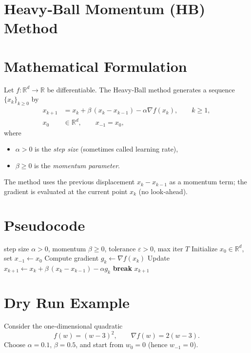\documentclass{article}
\newcommand{\R}{\mathbb{R}}
\newcommand{\norm}[1]{\left\|#1\right\|}
\begin{document}
\section*{Heavy‑Ball Momentum (HB) Method}

\section*{Mathematical Formulation}
Let $f:\R^{d}\to\R$ be differentiable.  The Heavy‑Ball method generates a sequence 
$\{x_k\}_{k\ge 0}$ by
\[
\boxed{
\begin{aligned}
x_{k+1}&=x_k+\beta\,(x_k-x_{k-1})-\alpha \nabla f(x_k),\qquad k\ge 1,\\[0.2em]
x_0&\in\R^{d},\qquad x_{-1}=x_0,
\end{aligned}}
\]
where 
\begin{itemize}
\item $\alpha>0$ is the \emph{step size} (sometimes called learning rate),
\item $\beta\ge 0$ is the \emph{momentum parameter}.
\end{itemize}
The method uses the previous displacement $x_k-x_{k-1}$ as a momentum term; the gradient is evaluated at the current point $x_k$ (no look‑ahead).

\section*{Pseudocode}
\begin{algorithm}[H]
\caption{Heavy‑Ball Momentum}
\begin{algorithmic}[1]
\REQUIRE step size $\alpha>0$, momentum $\beta\ge0$, tolerance $\varepsilon>0$, max iter $T$
\STATE Initialize $x_0\in\R^{d}$, set $x_{-1}\gets x_0$
    \STATE Compute gradient $g_k\gets\nabla f(x_k)$
    \STATE Update $x_{k+1}\gets x_k+\beta\,(x_k-x_{k-1})-\alpha g_k$
    \IF{$\norm{g_k}\le\varepsilon$}
        \STATE \textbf{break}
    \ENDIF
\ENDFOR
\RETURN $x_{k+1}$
\end{algorithmic}
\end{algorithm}

\section*{Dry Run Example}
Consider the one‑dimensional quadratic 
\[
f(w)=(w-3)^2,\qquad \nabla f(w)=2(w-3).
\]
Choose $\alpha=0.1$, $\beta=0.5$, and start from $w_0=0$ (hence $w_{-1}=0$).
\end{document}
